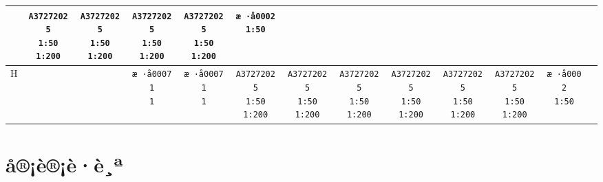 \documentclass[UTF8,10pt,a4paper,fontset=fandol]{ctexart}
\begin{document}
\begin{center}
{\begin{tabular}{c|c|c|c|c|c|c|c|c|c|c|c|c}
  & \texttt{A37272025\\1:50\\1:200}
  & \texttt{A37272025\\1:50\\1:200}
  & \texttt{A37272025\\1:50\\1:200}
  & \texttt{A37272025\\1:50\\1:200}
  & \texttt{æ ·å0002\\1:50}
  & \\
\hline
H & &
  & \texttt{æ ·å0007\\1\\1}
  & \texttt{æ ·å0007\\1\\1}
  & \texttt{A37272025\\1:50\\1:200}
  & \texttt{A37272025\\1:50\\1:200}
  & \texttt{A37272025\\1:50\\1:200}
  & \texttt{A37272025\\1:50\\1:200}
  & \texttt{A37272025\\1:50\\1:200}
  & \texttt{A37272025\\1:50\\1:200}
  & \texttt{æ ·å0002\\1:50}
  & \\
\hline
\end{tabular}%
}
\end{center}

\section*{å®¡è®¡è·è¸ª}
\end{document}
